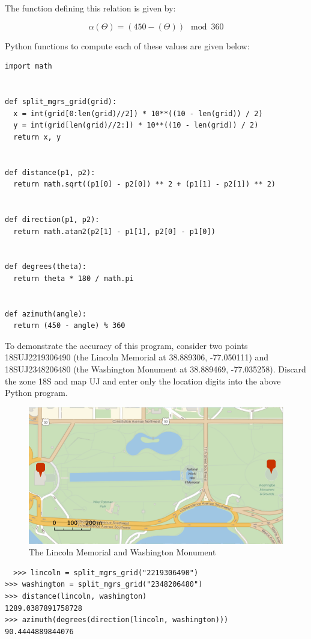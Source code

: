 \documentclass{book}
\begin{document}
The function defining this relation is given by:

\begin{equation}
\alpha(\Theta) = (450 - (\Theta)) \mod{360}
\end{equation}

Python functions to compute each of these values are given below:

\begin{lstlisting}
import math


def split_mgrs_grid(grid):
  x = int(grid[0:len(grid)//2]) * 10**((10 - len(grid)) / 2)
  y = int(grid[len(grid)//2:]) * 10**((10 - len(grid)) / 2)
  return x, y


def distance(p1, p2):
  return math.sqrt((p1[0] - p2[0]) ** 2 + (p1[1] - p2[1]) ** 2)


def direction(p1, p2):
  return math.atan2(p2[1] - p1[1], p2[0] - p1[0])


def degrees(theta):
  return theta * 180 / math.pi


def azimuth(angle):
  return (450 - angle) % 360
\end{lstlisting}

To demonstrate the accuracy of this program, consider two points 18SUJ2219306490 (the Lincoln Memorial at 38.889306, -77.050111) and 18SUJ2348206480 (the Washington Monument at 38.889469, -77.035258). Discard the zone 18S and map UJ and enter only the location digits into the above Python program.

\begin{figure}[b]
\centering
\includegraphics[width=\textwidth,keepaspectratio]{figures/washington-lincoln}
\caption{The Lincoln Memorial and Washington Monument}
\end{figure}

\begin{lstlisting}
  >>> lincoln = split_mgrs_grid("2219306490")
>>> washington = split_mgrs_grid("2348206480")
>>> distance(lincoln, washington)
1289.0387891758728
>>> azimuth(degrees(direction(lincoln, washington)))
90.4444889844076
\end{lstlisting}
\end{document}
